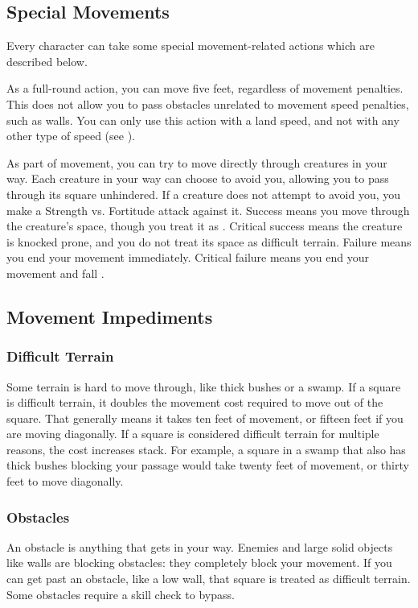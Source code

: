     \subsection{Special Movements}

        Every character can take some special movement-related actions which are described below.

         As a full-round action, you can move five feet, regardless of movement penalties.
        This does not allow you to pass obstacles unrelated to movement speed penalties, such as walls.
        You can only use this action with a land speed, and not with any other type of speed (see ).

        \label{Overrun} As part of movement, you can try to move directly through creatures in your way.
        Each creature in your way can choose to avoid you, allowing you to pass through its square unhindered.
        If a creature does not attempt to avoid you, you make a Strength vs. Fortitude attack against it.
        Success means you move through the creature's space, though you treat it as .
        Critical success means the creature is knocked prone, and you do not treat its space as difficult terrain.
        Failure means you end your movement immediately.
        Critical failure means you end your movement and fall \prone.

    \subsection{Movement Impediments}

        \subsubsection{Difficult Terrain}\label{Difficult Terrain}
            Some terrain is hard to move through, like thick bushes or a swamp. If a square is difficult terrain, it doubles the movement cost required to move out of the square. That generally means it takes ten feet of movement, or fifteen feet if you are moving diagonally. If a square is considered difficult terrain for multiple reasons, the cost increases stack. For example, a square in a swamp that also has thick bushes blocking your passage would take twenty feet of movement, or thirty feet to move diagonally.

        \subsubsection{Obstacles}
            An obstacle is anything that gets in your way. Enemies and large solid objects like walls are blocking obstacles: they completely block your movement. If you can get past an obstacle, like a low wall, that square is treated as difficult terrain. Some obstacles require a skill check to bypass.

